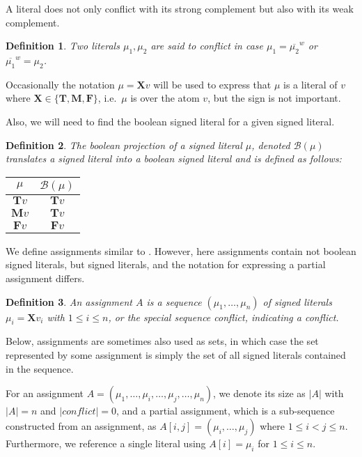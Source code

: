 \documentclass[final]{vutinfth} %
\newtheorem{definition}{Definition}[chapter]
\newtheorem*{remark}{Remark}
\newcommand{\negweak}[1]{\overline{#1}^w}
\newcommand{\bass}{\mathcal{B}}
\newcommand{\ass}{A}
\newcommand{\bT}{\mathbf{T}}
\newcommand{\bM}{\mathbf{M}}
\newcommand{\bF}{\mathbf{F}}
\newcommand{\bX}{\mathbf{X}}
\newcommand{\sgl}{\mu}
\newcommand{\thrice}{{\{\bT, \bM, \bF \}}}
\begin{document}
A literal does not only conflict with its strong complement but also with its weak complement.

\begin{definition}
Two literals $\sgl_1, \sgl_2$ are said to \emph{conflict} in case $\sgl_1 = \negweak{\sgl_2}$ or $\negweak{\sgl_1} = \sgl_2$.
\end{definition}

Occasionally the notation $\sgl = \bX v$ will be used to express that $\sgl$ is a literal of $v$ where $\bX \in \thrice$, i.e.~$\sgl$ is over the atom $v$, but the sign is not important.

Also, we will need to find the boolean signed literal for a given signed literal.

\begin{definition}
The \emph{boolean projection} of a signed literal $\sgl$, denoted $\bass(\sgl)$ translates a signed literal into a boolean signed literal and is defined as follows:

\begin{center}
\begin{tabular}{|c|c|}
\hline
$\sgl$&$\bass(\sgl)$\\
\hline
\hline
$\bT v$&$\bT v$\\
$\bM v$&$\bT v$\\
$\bF v$&$\bF v$\\
\hline
\end{tabular}
\end{center}
\end{definition}

We define assignments similar to \cite[Section 2, p.~3]{clasp}. However, here assignments contain not boolean signed literals, but signed literals, and the notation for expressing a partial assignment differs.

\begin{definition}
An \emph{assignment} $\ass$ is a sequence $(\sgl_1, \ldots, \sgl_n)$ of signed literals $\sgl_i = \bX v_i$ with $1 \leq i \leq n$, or the special sequence \emph{conflict}, indicating a conflict.
\end{definition}

Below, assignments are sometimes also used as sets, in which case the set represented by some assignment is simply the set of all signed literals contained in the sequence.

For an assignment $\ass = (\sgl_1, \ldots, \sgl_i, \ldots, \sgl_j, \ldots, \sgl_n)$, we denote its size as $|\ass|$ with $|\ass| = n$ and $|conflict| = 0$, and a partial assignment, which is a sub-sequence constructed from an assignment, as $\ass[i,j] = (\sgl_i, \ldots, \sgl_j)$ where $1 \leq i < j \leq n$. Furthermore, we reference a single literal using $A[i] = \sgl_i$ for $1 \leq i \leq n$.
\end{document}
